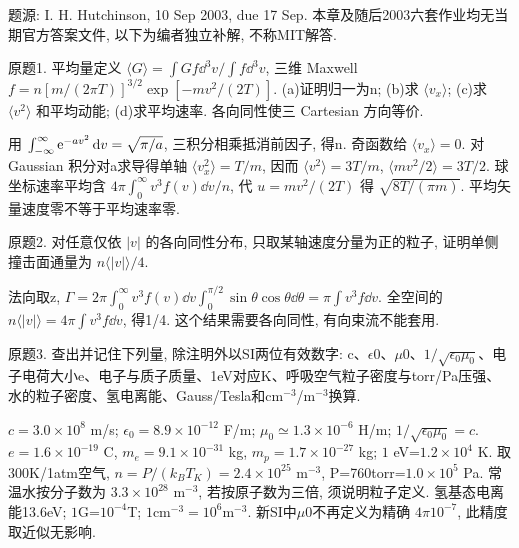 题源: I. H. Hutchinson, 10 Sep 2003, due 17 Sep. 本章及随后2003六套作业均无当期官方答案文件, 以下为编者独立补解, 不称MIT解答.
\begin{exercise}\label{ex:03-1-1}
原题1. 平均量定义 $\langle G\rangle=\int Gf\dd^3v/\int f\dd^3v$, 三维 Maxwell $f=n[m/(2\pi T)]^{3/2}\exp[-mv^2/(2T)]$. (a)证明归一为n; (b)求 $\langle v_x\rangle$; (c)求 $\langle v^2\rangle$ 和平均动能; (d)求平均速率. 各向同性使三 Cartesian 方向等价.
\end{exercise}
\begin{solution}
用 $\int_{-\infty}^{\infty}\mathrm e^{-av^2}\,\mathrm d v=\sqrt{\pi/a}$, 三积分相乘抵消前因子, 得n. 奇函数给 $\langle v_x\rangle=0$. 对 Gaussian 积分对a求导得单轴 $\langle v_x^2\rangle=T/m$, 因而 $\langle v^2\rangle=3T/m$, $\langle mv^2/2\rangle=3T/2$. 球坐标速率平均含 $4\pi\int_0^\infty v^3f(v)\dd v/n$, 代 $u=mv^2/(2T)$ 得 $\sqrt{8T/(\pi m)}$. 平均矢量速度零不等于平均速率零.
\end{solution}
\begin{exercise}\label{ex:03-1-2}
原题2. 对任意仅依 $|v|$ 的各向同性分布, 只取某轴速度分量为正的粒子, 证明单侧撞击面通量为 $n\langle|v|\rangle/4$.
\end{exercise}
\begin{solution}
法向取z, $\Gamma=2\pi\int_0^\infty v^3f(v)\dd v\int_0^{\pi/2}\sin\theta\cos\theta\dd\theta=\pi\int v^3f\dd v$. 全空间的 $n\langle|v|\rangle=4\pi\int v^3f\dd v$, 得1/4. 这个结果需要各向同性, 有向束流不能套用.
\end{solution}
\begin{exercise}\label{ex:03-1-3}
原题3. 查出并记住下列量, 除注明外以SI两位有效数字: c、\ensuremath{\epsilon}0、\ensuremath{\mu}0、$1/\sqrt{\epsilon_0\mu_0}$、电子电荷大小e、电子与质子质量、1eV对应K、呼吸空气粒子密度与torr/Pa压强、水的粒子密度、氢电离能、Gauss/Tesla和cm$^{-3}$/m$^{-3}$换算.
\end{exercise}
\begin{solution}
$c=3.0\times10^8$ m/s; $\epsilon_0=8.9\times10^{-12}$ F/m; $\mu_0\simeq1.3\times10^{-6}$ H/m; $1/\sqrt{\epsilon_0\mu_0}=c$. $e=1.6\times10^{-19}$ C, $m_e=9.1\times10^{-31}$ kg, $m_p=1.7\times10^{-27}$ kg; $1$ eV=$1.2\times10^4$ K. 取300K/1atm空气, $n=P/(k_BT_K)=2.4\times10^{25}$ m$^{-3}$, P=760torr=$1.0\times10^5$ Pa. 常温水按分子数为 $3.3\times10^{28}$ m$^{-3}$, 若按原子数为三倍, 须说明粒子定义. 氢基态电离能13.6eV; $1$G=$10^{-4}$T; $1$cm$^{-3}=10^6$m$^{-3}$. 新SI中\ensuremath{\mu}0不再定义为精确 $4\pi10^{-7}$, 此精度取近似无影响.
\end{solution}
